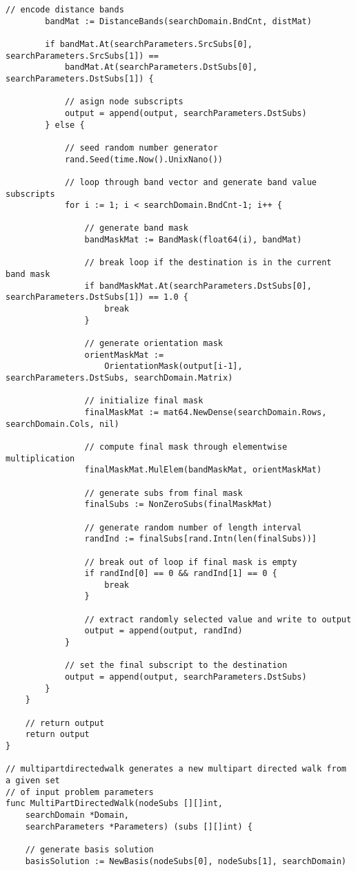 \begin{lstlisting}[basicstyle=\tiny]
		// encode distance bands
		bandMat := DistanceBands(searchDomain.BndCnt, distMat)

		if bandMat.At(searchParameters.SrcSubs[0], searchParameters.SrcSubs[1]) == 
		    bandMat.At(searchParameters.DstSubs[0], searchParameters.DstSubs[1]) {

			// asign node subscripts
			output = append(output, searchParameters.DstSubs)
		} else {

			// seed random number generator
			rand.Seed(time.Now().UnixNano())

			// loop through band vector and generate band value subscripts
			for i := 1; i < searchDomain.BndCnt-1; i++ {

				// generate band mask
				bandMaskMat := BandMask(float64(i), bandMat)

				// break loop if the destination is in the current band mask
				if bandMaskMat.At(searchParameters.DstSubs[0], searchParameters.DstSubs[1]) == 1.0 {
					break
				}

				// generate orientation mask
				orientMaskMat := 
				    OrientationMask(output[i-1], searchParameters.DstSubs, searchDomain.Matrix)

				// initialize final mask
				finalMaskMat := mat64.NewDense(searchDomain.Rows, searchDomain.Cols, nil)

				// compute final mask through elementwise multiplication
				finalMaskMat.MulElem(bandMaskMat, orientMaskMat)

				// generate subs from final mask
				finalSubs := NonZeroSubs(finalMaskMat)

				// generate random number of length interval
				randInd := finalSubs[rand.Intn(len(finalSubs))]

				// break out of loop if final mask is empty
				if randInd[0] == 0 && randInd[1] == 0 {
					break
				}

				// extract randomly selected value and write to output
				output = append(output, randInd)
			}

			// set the final subscript to the destination
			output = append(output, searchParameters.DstSubs)
		}
	}

	// return output
	return output
}

// multipartdirectedwalk generates a new multipart directed walk from a given set
// of input problem parameters
func MultiPartDirectedWalk(nodeSubs [][]int, 
    searchDomain *Domain, 
    searchParameters *Parameters) (subs [][]int) {

	// generate basis solution
	basisSolution := NewBasis(nodeSubs[0], nodeSubs[1], searchDomain)


\end{lstlisting}
